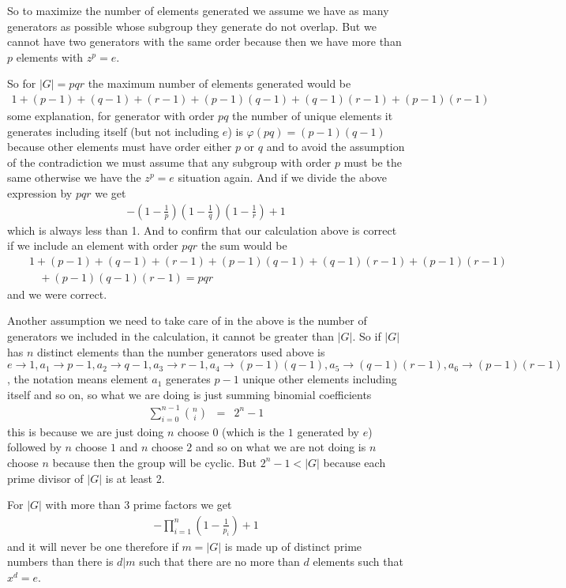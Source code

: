 \documentclass[aps,preprint,preprintnumbers,nofootinbib,showpacs,prd]{revtex4-1}
\newcommand{\nbea}{\begin{eqnarray*}}
\newcommand{\neea}{\end{eqnarray*}}
\begin{document}
So to maximize the number of elements generated we assume we have as many generators as possible whose subgroup they generate do not overlap. But we cannot have two generators with the same order because then we have more than $p$ elements with $z^p = e$. 

So for $|G| = pqr$ the maximum number of elements generated would be 
%
\nbea
1 + (p - 1) + (q - 1) + (r - 1) + (p - 1)(q - 1) + (q - 1)(r - 1) + (p - 1)(r - 1)  
\neea
%                                
some explanation, for generator with order $pq$ the number of unique elements it generates including itself (but not including $e$) is $\varphi(pq) = (p - 1)(q - 1)$ because other elements must have order either $p$ or $q$ and to avoid the assumption of the contradiction we must assume that any subgroup with order $p$ must be the same otherwise we have the $z^p = e$ situation again. And if we divide the above expression by $pqr$ we get 
%
\nbea
- \left( 1 - \frac{1}{p} \right ) \left( 1 - \frac{1}{q} \right ) \left( 1 - \frac{1}{r} \right )  + 1 
\neea
%       
which is always less than 1. And to confirm that our calculation above is correct if we include an element with order $pqr$ the sum would be 
%
\nbea
&& 1 + (p - 1) + (q - 1) + (r - 1) + (p - 1)(q - 1) + (q - 1)(r - 1) + (p - 1)(r - 1)  \\
&& ~~~~ + (p - 1)(q - 1)(r - 1) = pqr 
\neea
%
and we were correct.

Another assumption we need to take care of in the above is the number of generators we included in the calculation, it cannot be greater than $|G|$. So if $|G|$ has $n$ distinct elements than the number generators used above is $e \to 1, a_1 \to p - 1, a_2 \to q - 1, a_3 \to r - 1, a_4 \to (p - 1)(q - 1), a_5 \to (q - 1)(r - 1), a_6 \to (p - 1)(r - 1)$, the notation means element $a_1$ generates $p - 1$ unique other elements including itself and so on, so what we are doing is just summing binomial coefficients   
%
\nbea
\sum_{i = 0}^{n - 1} \binom{n}{i} & = & 2^n - 1
\neea
%
this is because we are just doing $n$ choose 0 (which is the $1$ generated by $e$) followed by $n$ choose $1$ and $n$ choose $2$ and so on what we are not doing is $n$ choose $n$ because then the group will be cyclic. But $2^n - 1 < |G|$ because each prime divisor of $|G|$ is at least 2. 

For $|G|$ with more than 3 prime factors we get 
%
\nbea
-\prod_{i=1}^{n} \left ( 1 - \frac{1}{p_i} \right )  + 1 
\neea
%
and it will never be one therefore if $m = |G|$ is made up of distinct prime numbers than there is $d|m$ such that there are no more than $d$ elements such that $x^d = e$. 
\end{document}
